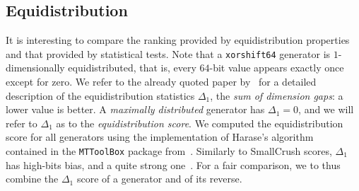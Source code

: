 \documentclass{acmsmalltr}
\newcommand{\xorshift}[1][]{\texttt{xorshift#1}\xspace}
\begin{document}
\begin{table}
\end{table} 

\subsection{Equidistribution}

It is interesting to compare the ranking provided
by equidistribution properties and that provided by statistical tests. 
Note that a \xorshift[64] generator is
$1$-dimensionally equidistributed, that is, every $64$-bit value appears exactly
once except for zero.
We refer to
the already quoted paper by~ for a detailed
description of the equidistribution statistics $\Delta_1$, the \emph{sum of
dimension gaps}: a lower value is better. A \emph{maximally distributed}
generator has $\Delta_1=0$, and we will refer to $\Delta_1$ as to the
\emph{equidistribution score}.
We computed the equidistribution score for all generators using the implementation of Harase's algorithm~\cite{HarELRM}
contained in the \texttt{MTToolBox} package from~.
Similarly to SmallCrush scores, $\Delta_1$ has 
high-bits bias, and a quite strong one~\cite{LEPFRNG}. 
For a fair comparison, we to thus combine the $\Delta_1$ score of a generator
and of its reverse.  
\end{document}
